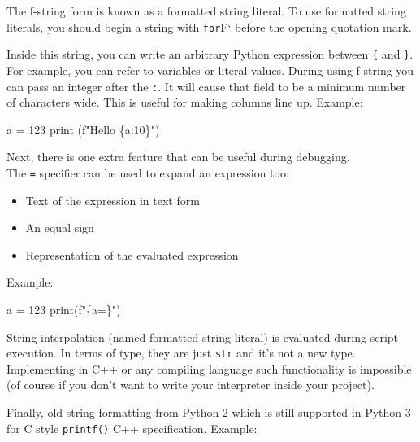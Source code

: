 \documentclass[
]{article}
\newenvironment{Shaded}{}{}
\newcommand{\BuiltInTok}[1]{#1}
\newcommand{\DecValTok}[1]{\textcolor[rgb]{0.25,0.63,0.44}{#1}}
\newcommand{\NormalTok}[1]{#1}
\newcommand{\OperatorTok}[1]{\textcolor[rgb]{0.40,0.40,0.40}{#1}}
\newcommand{\SpecialCharTok}[1]{\textcolor[rgb]{0.25,0.44,0.63}{#1}}
\newcommand{\SpecialStringTok}[1]{\textcolor[rgb]{0.73,0.40,0.53}{#1}}
\begin{document}
The f-string form is known as a formatted string literal. To use
formatted string literals, you should begin a string with \texttt{for}F`
before the opening quotation mark.

Inside this string, you can write an arbitrary Python expression between
\texttt{\{} and \texttt{\}}. For example, you can refer to variables or
literal values. During using f-string you can pass an integer after the
\texttt{:}. It will cause that field to be a minimum number of
characters wide. This is useful for making columns line up. Example:

\begin{Shaded}
\begin{Highlighting}[]
\NormalTok{a }\OperatorTok{=} \DecValTok{123}
\BuiltInTok{print}\NormalTok{ (}\SpecialStringTok{f"Hello }\SpecialCharTok{\{}\NormalTok{a}\SpecialCharTok{:10\}}\SpecialStringTok{"}\NormalTok{)}
\end{Highlighting}
\end{Shaded}

Next, there is one extra feature that can be useful during debugging.\\
The \texttt{=} specifier can be used to expand an expression too:

\begin{itemize}
\item
  Text of the expression in text form
\item
  An equal sign
\item
  Representation of the evaluated expression
\end{itemize}

Example:

\begin{Shaded}
\begin{Highlighting}[]
\NormalTok{a }\OperatorTok{=} \DecValTok{123}
\BuiltInTok{print}\NormalTok{(}\SpecialStringTok{f"}\SpecialCharTok{\{}\NormalTok{a}\OperatorTok{=}\SpecialCharTok{\}}\SpecialStringTok{"}\NormalTok{)}
\end{Highlighting}
\end{Shaded}

String interpolation (named formatted string literal) is evaluated
during script execution. In terms of type, they are just \texttt{str}
and it's not a new type. Implementing in C++ or any compiling language
such functionality is impossible (of course if you don't want to write
your interpreter inside your project).

Finally, old string formatting from Python 2 which is still supported in
Python 3 for C style \texttt{printf()} C++ specification. Example:
\end{document}
